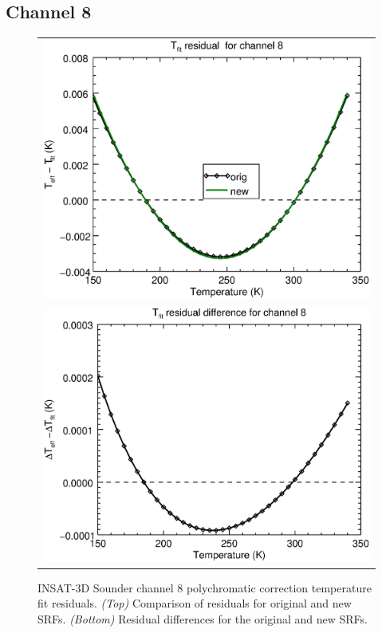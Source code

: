 \subsection{Channel 8}
\begin{figure}[H]
  \centering
  \begin{tabular}{c}
    \includegraphics[scale=0.55]{graphics/sndr/tfit/sndr_insat3d-8.tfit.eps} \\
    \includegraphics[scale=0.55]{graphics/sndr/tfit/sndr_insat3d-8.tfit.difference.eps}
  \end{tabular}
  \caption{INSAT-3D Sounder channel 8 polychromatic correction temperature fit residuals. \emph{(Top)} Comparison of residuals for original and new SRFs. \emph{(Bottom)} Residual differences for the original and new SRFs.}
  \label{fig:sndr_ch8_tfit}
\end{figure}

